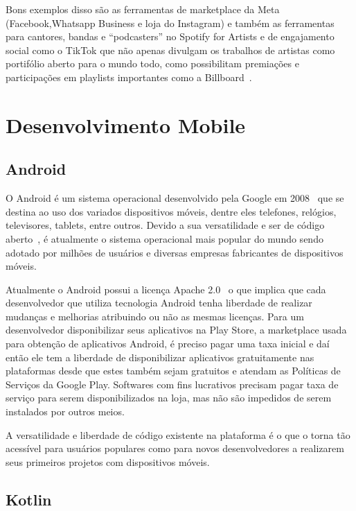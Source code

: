 Bons exemplos disso são as ferramentas de marketplace da Meta (Facebook,Whatsapp Business e loja do Instagram) e também as ferramentas para cantores, bandas e “podcasters” no Spotify for Artists e de engajamento social como o TikTok que não apenas divulgam os trabalhos de artistas como portifólio aberto para o mundo todo, como possibilitam premiações e participações em playlists importantes como a Billboard~\cite{tiktok}.

\section{Desenvolvimento Mobile}\label{sec:desenvolvimento-mobile}

\subsection{Android}\label{subsec:android}

O Android é um sistema operacional desenvolvido pela Google em 2008~\cite{rpt} que se destina ao uso dos variados dispositivos móveis, dentre eles telefones, relógios, televisores, tablets, entre outros.
Devido a sua versatilidade e ser de código aberto~\cite{licences_android}, é atualmente o sistema operacional mais popular do mundo sendo adotado por milhões de usuários e diversas empresas fabricantes de dispositivos móveis.

Atualmente o Android possui a licença Apache 2.0~\cite{licences_android} o que implica que cada desenvolvedor que utiliza tecnologia Android tenha liberdade de realizar mudanças e melhorias atribuindo ou não as mesmas licenças.
Para um desenvolvedor disponibilizar seus aplicativos na Play Store, a marketplace usada para obtenção de aplicativos Android, é preciso pagar uma taxa inicial e daí então ele tem a liberdade de disponibilizar aplicativos gratuitamente nas plataformas desde que estes também sejam gratuitos e atendam as Políticas de Serviços da Google Play.
Softwares com fins lucrativos precisam pagar taxa de serviço para serem disponibilizados na loja, mas não são impedidos de serem instalados por outros meios.

A versatilidade e liberdade de código existente na plataforma é o que o torna tão acessível para usuários populares como para novos desenvolvedores a realizarem seus primeiros projetos com dispositivos móveis.

\subsection{Kotlin}\label{subsec:kotlin}


